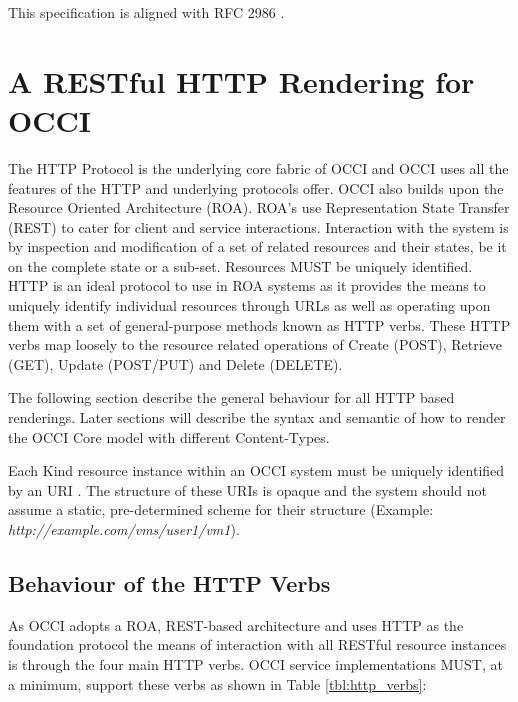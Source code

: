 \documentclass[10pt,a4paper]{article}
\begin{document}
This specification is aligned with RFC 2986 \cite{rfc3986}.

\section{A RESTful HTTP Rendering for OCCI}
The HTTP Protocol is the underlying core fabric of OCCI and OCCI uses
all the features of the HTTP and underlying protocols offer.  OCCI
also builds upon the Resource Oriented Architecture (ROA).  ROA's use
Representation State Transfer (REST) \cite{REST_Fielding} to cater for
client and service interactions. Interaction with the system is by
inspection and modification of a set of related resources and their
states, be it on the complete state or a sub-set. Resources MUST be
uniquely identified. HTTP is an ideal protocol to use in ROA systems
as it provides the means to uniquely identify individual resources
through URLs as well as operating upon them with a set of
general-purpose methods known as HTTP verbs. These HTTP verbs map
loosely to the resource related operations of Create (POST), Retrieve
(GET), Update (POST/PUT) and Delete (DELETE).

The following section describe the general behaviour for all HTTP
based renderings. Later sections will describe the syntax and semantic
of how to render the OCCI Core model with different Content-Types.

Each Kind resource instance within an OCCI system must be uniquely
identified by an URI \cite{occi:core}. The structure of these URIs is
opaque and the system should not assume a static, pre-determined
scheme for their structure (Example:
\emph{http://example.com/vms/user1/vm1}).

\subsection{Behaviour of the HTTP Verbs}
As OCCI adopts a ROA, REST-based architecture and uses HTTP as the
foundation protocol the means of interaction with all RESTful resource
instances is through the four main HTTP verbs. OCCI service
implementations MUST, at a minimum, support these verbs as shown in
Table \ref{tbl:http_verbs}:
\end{document}
